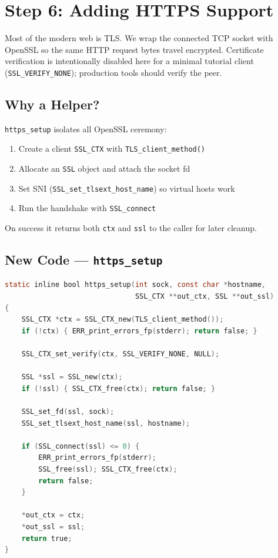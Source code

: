 \section{Step 6: Adding HTTPS Support}

Most of the modern web is TLS. We wrap the connected TCP socket with OpenSSL
so the same HTTP request bytes travel encrypted. Certificate verification is
intentionally disabled here for a minimal tutorial client
(\texttt{SSL\_VERIFY\_NONE}); production tools should verify the peer.

\subsection{Why a Helper?}

\texttt{https\_setup} isolates all OpenSSL ceremony:

\begin{enumerate}[leftmargin=1.4em]
    \item Create a client \texttt{SSL\_CTX} with \texttt{TLS\_client\_method()}
    \item Allocate an \texttt{SSL} object and attach the socket fd
    \item Set SNI (\texttt{SSL\_set\_tlsext\_host\_name}) so virtual hosts work
    \item Run the handshake with \texttt{SSL\_connect}
\end{enumerate}

On success it returns both \texttt{ctx} and \texttt{ssl} to the caller for
later cleanup.

\subsection{New Code --- \texttt{https\_setup}}

\begin{lstlisting}[style=snippet,language=C]
static inline bool https_setup(int sock, const char *hostname,
                               SSL_CTX **out_ctx, SSL **out_ssl)
{
    SSL_CTX *ctx = SSL_CTX_new(TLS_client_method());
    if (!ctx) { ERR_print_errors_fp(stderr); return false; }

    SSL_CTX_set_verify(ctx, SSL_VERIFY_NONE, NULL);

    SSL *ssl = SSL_new(ctx);
    if (!ssl) { SSL_CTX_free(ctx); return false; }

    SSL_set_fd(ssl, sock);
    SSL_set_tlsext_host_name(ssl, hostname);

    if (SSL_connect(ssl) <= 0) {
        ERR_print_errors_fp(stderr);
        SSL_free(ssl); SSL_CTX_free(ctx);
        return false;
    }

    *out_ctx = ctx;
    *out_ssl = ssl;
    return true;
}
\end{lstlisting}

